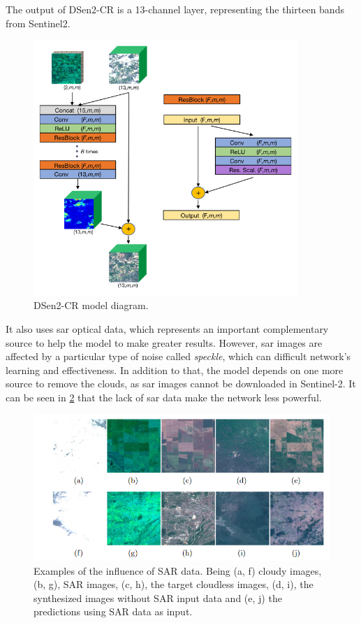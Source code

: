 \documentclass[../main.tex]{subfiles}
\begin{document}
The  output of DSen2-CR is a 13-channel layer, representing the thirteen bands from Sentinel2.  
\begin{figure}[H]
	\centering
	\includegraphics[width=10cm]{imgs/relatedwork/sar.png}
	\caption{DSen2-CR model diagram.}
	\label{fig:related-dsen2-cr}
\end{figure}
It also uses
\gls{sar} 
optical data, which represents an important complementary source to help the model to make greater results. However, \gls{sar} images are affected by a particular type of noise called \textit{speckle}, which can difficult network's learning and effectiveness. In addition to that, the model depends on one more source to remove the clouds, as \gls{sar} images cannot be downloaded in Sentinel-2. It can be seen in \ref{fig:related-dsen2-cr-predictions} that the lack of \gls{sar} data make the network less powerful. 
\begin{figure}[H]
	\centering
	\includegraphics[width=13cm]{imgs/relatedwork/dsen2-cr-predictions.png}
	\caption{Examples of the influence of SAR data. Being (a, f) cloudy images, (b, g), SAR images, (c, h), the target cloudless images, (d, i), the synthesized images without SAR input data and (e, j) the predictions using SAR data as input.}
	\label{fig:related-dsen2-cr-predictions}
\end{figure}
\end{document}
